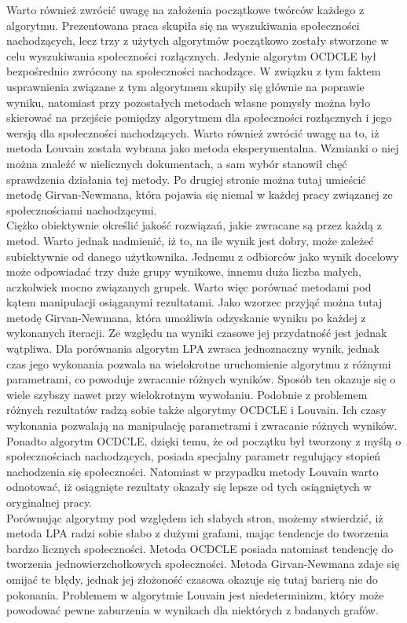 \documentclass{article}
\begin{document}
Warto również zwrócić uwagę na założenia początkowe twórców każdego z algorytmu. Prezentowana praca skupiła się na wyszukiwania społeczności nachodzących, lecz trzy z użytych algorytmów początkowo zostały stworzone w celu wyszukiwania społeczności rozłącznych. Jedynie algorytm OCDCLE był bezpośrednio zwrócony na społeczności nachodzące. W związku z tym faktem usprawnienia związane z tym algorytmem skupiły się głównie na poprawie wyniku, natomiast przy pozostałych metodach własne pomysły można było skierować na przejście pomiędzy algorytmem dla społeczności rozłącznych i jego wersją dla społeczności nachodzących. Warto również zwrócić uwagę na to, iż metoda Louvain została wybrana jako metoda eksperymentalna. Wzmianki o niej można znaleźć w nielicznych dokumentach, a sam wybór stanowił chęć sprawdzenia działania tej metody. Po drugiej stronie można tutaj umieścić metodę Girvan-Newmana, która pojawia się niemal w każdej pracy związanej ze społecznościami nachodzącymi. \\

Ciężko obiektywnie określić jakość rozwiązań, jakie zwracane są przez każdą z metod. Warto jednak nadmienić, iż to, na ile wynik jest dobry, może zależeć subiektywnie od danego użytkownika. Jednemu z odbiorców jako wynik docelowy może odpowiadać trzy duże grupy wynikowe, innemu duża liczba małych, aczkolwiek mocno związanych grupek. Warto więc porównać metodami pod kątem manipulacji osiąganymi rezultatami. Jako wzorzec przyjąć można tutaj metodę Girvan-Newmana, która umożliwia odzyskanie wyniku po każdej z wykonanych iteracji. Ze względu na wyniki czasowe jej przydatność jest jednak wątpliwa. Dla porównania algorytm LPA zwraca jednoznaczny wynik, jednak czas jego wykonania pozwala na wielokrotne uruchomienie algorytmu z różnymi parametrami, co powoduje zwracanie różnych wyników. Sposób ten okazuje się o wiele szybszy nawet przy wielokrotnym wywołaniu. Podobnie z problemem różnych rezultatów radzą sobie także algorytmy OCDCLE i Louvain. Ich czasy wykonania pozwalają na manipulację parametrami i zwracanie różnych wyników. Ponadto algorytm OCDCLE, dzięki temu, że od początku był tworzony z myślą o społecznościach nachodzących, posiada specjalny parametr regulujący stopień nachodzenia się społeczności. Natomiast w przypadku metody Louvain warto odnotować, iż osiągnięte rezultaty okazały się lepsze od tych osiągniętych w oryginalnej pracy.\\

Porównując algorytmy pod względem ich słabych stron, możemy stwierdzić, iż metoda LPA radzi sobie słabo z dużymi grafami, mając tendencje do tworzenia bardzo licznych społeczności. Metoda OCDCLE posiada natomiast tendencję do tworzenia jednowierzchołkowych społeczności. Metoda Girvan-Newmana zdaje się omijać te błędy, jednak jej złożoność czasowa okazuje się tutaj barierą nie do pokonania. Problemem w algorytmie Louvain jest niedeterminizm, który może powodować pewne zaburzenia w wynikach dla niektórych z badanych grafów. \\
 
\end{document}
